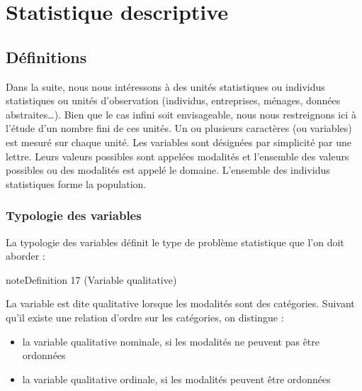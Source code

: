 \documentclass[letterpaper,10pt,french]{sphinxmanual}
\begin{document}
\sphinxstepscope


\chapter{Statistique descriptive}
\label{\detokenize{statsdescriptives:statistique-descriptive}}\label{\detokenize{statsdescriptives::doc}}

\section{Définitions}
\label{\detokenize{statsdescriptives:definitions}}
\sphinxAtStartPar
Dans la suite, nous nous intéressons à des unités statistiques ou individus statistiques ou unités d’observation (individus,  entreprises,  ménages, données abstraites…). Bien que le cas infini soit envisageable, nous nous restreignons ici à l’étude d’un nombre fini de ces unités. Un ou plusieurs caractères (ou variables) est mesuré sur chaque unité. Les variables sont désignées par simplicité par une lettre. Leurs valeurs possibles sont appelées modalités et l’ensemble des valeurs possibles ou des modalités est appelé le domaine. L’ensemble des individus statistiques forme la population.


\subsection{Typologie des variables}
\label{\detokenize{statsdescriptives:typologie-des-variables}}
\sphinxAtStartPar
La typologie des variables définit le type de problème statistique que l’on doit aborder :

\ignorespaces \label{statsdescriptives:definition-0}
\begin{sphinxadmonition}{note}{Definition 17 (Variable qualitative)}



\sphinxAtStartPar
La variable est dite qualitative lorsque les modalités sont des catégories. Suivant qu’il existe une relation d’ordre sur les catégories, on distingue :
\begin{itemize}
\item {} 
\sphinxAtStartPar
la variable qualitative nominale, si les modalités  ne peuvent pas être ordonnées

\item {} 
\sphinxAtStartPar
la variable qualitative ordinale, si les modalités peuvent être ordonnées

\end{itemize}
\end{sphinxadmonition}
\end{document}
